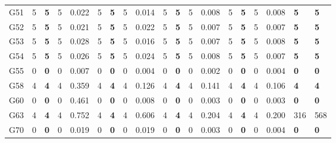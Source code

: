 \documentclass[12pt, a4paper]{article}%
\numberwithin{equation}{section}
\theoremstyle{plain}
\begin{document}
{\begin{landscape}
\begin{longtable}{lllllllllllllllllll}
						G51                       & 5    & \textbf{5}  & 5   & 0.022 & 5    & \textbf{5}  & 5   & 0.014 & 5    & \textbf{5}  & 5   & 0.008 & 5    & \textbf{5}  & 5   & 0.008 & \textbf{5}              & \textbf{5}           \\
						G52                       & 5    & \textbf{5}  & 5   & 0.021 & 5    & \textbf{5}  & 5   & 0.022 & 5    & \textbf{5}  & 5   & 0.007 & 5    & \textbf{5}  & 5   & 0.007 & \textbf{5}              & \textbf{5}           \\
						G53                       & 5    & \textbf{5}  & 5   & 0.028 & 5    & \textbf{5}  & 5   & 0.016 & 5    & \textbf{5}  & 5   & 0.007 & 5    & \textbf{5}  & 5   & 0.008 & \textbf{5}              & \textbf{5}           \\
						G54                       & 5    & \textbf{5}  & 5   & 0.026 & 5    & \textbf{5}  & 5   & 0.024 & 5    & \textbf{5}  & 5   & 0.008 & 5    & \textbf{5}  & 5   & 0.007 & \textbf{5}              & \textbf{5}           \\
						G55                       & 0    & \textbf{0}  & 0   & 0.007 & 0    & \textbf{0}  & 0   & 0.004 & 0    & \textbf{0}  & 0   & 0.002 & 0    & \textbf{0}  & 0   & 0.004 & \textbf{0}              & \textbf{0}           \\
						G58                       & 4    & \textbf{4}  & 4   & 0.359 & 4    & \textbf{4}  & 4   & 0.126 & 4    & \textbf{4}  & 4   & 0.141 & 4    & \textbf{4}  & 4   & 0.106 & \textbf{4}              & \textbf{4}           \\
						G60                       & 0    & \textbf{0}  & 0   & 0.461 & 0    & \textbf{0}  & 0   & 0.008 & 0    & \textbf{0}  & 0   & 0.003 & 0    & \textbf{0}  & 0   & 0.003 & \textbf{0}              & \textbf{0}           \\
						G63                       & 4    & \textbf{4}  & 4   & 0.752 & 4    & \textbf{4}  & 4   & 0.606 & 4    & \textbf{4}  & 4   & 0.204 & 4    & \textbf{4}  & 4   & 0.200 & 316                     & 568                  \\
						G70                       & 0    & \textbf{0}  & 0   & 0.019 & 0    & \textbf{0}  & 0   & 0.019 & 0    & \textbf{0}  & 0   & 0.003 & 0    & \textbf{0}  & 0   & 0.004 & \textbf{0}              & \textbf{0}           \\ \hline
					\end{longtable}
				\end{landscape}
			}
			
\end{document}
